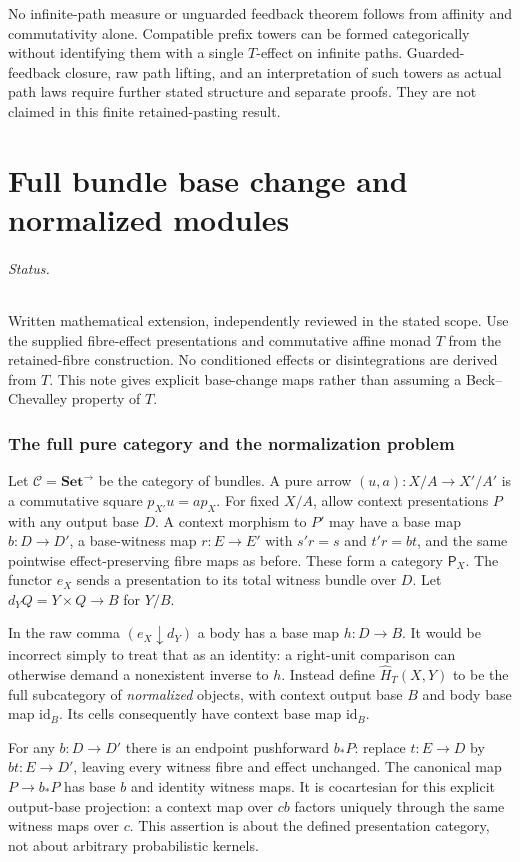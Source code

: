 \documentclass[11pt]{article}
\begin{document}
No infinite-path measure or unguarded feedback theorem follows from affinity and commutativity alone. Compatible prefix towers can be formed categorically without identifying them with a single $T$-effect on infinite paths. Guarded-feedback closure, raw path lifting, and an interpretation of such towers as actual path laws require further stated structure and separate proofs. They are not claimed in this finite retained-pasting result.

\part{Full bundle base change and normalized modules}

\paragraph{Status.} Written mathematical extension, independently reviewed in the stated scope. Use the supplied fibre-effect presentations and commutative affine monad $T$ from the retained-fibre construction. No conditioned effects or disintegrations are derived from $T$. This note gives explicit base-change maps rather than assuming a Beck--Chevalley property of $T$.

\section{The full pure category and the normalization problem}
Let $\mathcal C=\mathbf{Set}^{\to}$ be the category of bundles. A pure arrow $(u,a):X/A\to X'/A'$ is a commutative square $p_{X'}u=ap_X$. For fixed $X/A$, allow context presentations $P$ with any output base $D$. A context morphism to $P'$ may have a base map $b:D\to D'$, a base-witness map $r:E\to E'$ with $s'r=s$ and $t'r=bt$, and the same pointwise effect-preserving fibre maps as before. These form a category $\mathsf P_X$. The functor $e_X$ sends a presentation to its total witness bundle over $D$. Let $d_YQ=Y\times Q\to B$ for $Y/B$.

In the raw comma $(e_X\downarrow d_Y)$ a body has a base map $h:D\to B$. It would be incorrect simply to treat that as an identity: a right-unit comparison can otherwise demand a nonexistent inverse to $h$. Instead define $\widehat H_T(X,Y)$ to be the full subcategory of \emph{normalized} objects, with context output base $B$ and body base map $\mathrm{id}_B$. Its cells consequently have context base map $\mathrm{id}_B$.

For any $b:D\to D'$ there is an endpoint pushforward $b_*P$: replace $t:E\to D$ by $bt:E\to D'$, leaving every witness fibre and effect unchanged. The canonical map $P\to b_*P$ has base $b$ and identity witness maps. It is cocartesian for this explicit output-base projection: a context map over $c b$ factors uniquely through the same witness maps over $c$. This assertion is about the defined presentation category, not about arbitrary probabilistic kernels.
\end{document}
